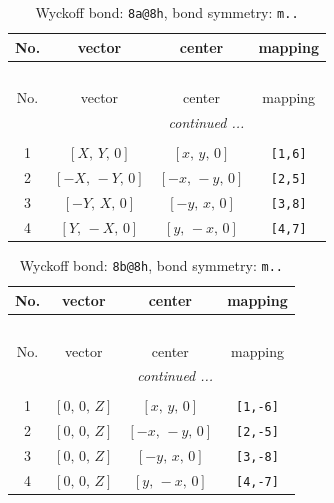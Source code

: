 \documentclass[fleqn,8pt]{jsarticle}
\begin{document}
\begin{longtable}{cccc}
\caption{Wyckoff bond: {\tt 8a@8h}, bond symmetry: {\tt m..}}
 \\
 \hline \hline
No. & vector & center & mapping \\ \hline \endfirsthead

\multicolumn{3}{l}{\tablename\ \thetable{}} \\
 \hline \hline
No. & vector & center & mapping \\ \hline \endhead

 \hline \hline
\multicolumn{3}{r}{\footnotesize\it continued ...} \\ \endfoot

 \hline \hline
\multicolumn{3}{r}{} \\ \endlastfoot

1 & $\left[ X,\, Y,\, 0 \right]$ & $\left[ x,\, y,\, 0 \right]$ & {\tt [1,6]} \\ \hline
2 & $\left[ - X,\, - Y,\, 0 \right]$ & $\left[ - x,\, - y,\, 0 \right]$ & {\tt [2,5]} \\ \hline
3 & $\left[ - Y,\, X,\, 0 \right]$ & $\left[ - y,\, x,\, 0 \right]$ & {\tt [3,8]} \\ \hline
4 & $\left[ Y,\, - X,\, 0 \right]$ & $\left[ y,\, - x,\, 0 \right]$ & {\tt [4,7]} \\
\end{longtable}
\renewcommand{\arraystretch}{1.2}
\begin{longtable}{cccc}
\caption{Wyckoff bond: {\tt 8b@8h}, bond symmetry: {\tt m..}}
 \\
 \hline \hline
No. & vector & center & mapping \\ \hline \endfirsthead

\multicolumn{3}{l}{\tablename\ \thetable{}} \\
 \hline \hline
No. & vector & center & mapping \\ \hline \endhead

 \hline \hline
\multicolumn{3}{r}{\footnotesize\it continued ...} \\ \endfoot

 \hline \hline
\multicolumn{3}{r}{} \\ \endlastfoot

1 & $\left[ 0,\, 0,\, Z \right]$ & $\left[ x,\, y,\, 0 \right]$ & {\tt [1,-6]} \\ \hline
2 & $\left[ 0,\, 0,\, Z \right]$ & $\left[ - x,\, - y,\, 0 \right]$ & {\tt [2,-5]} \\ \hline
3 & $\left[ 0,\, 0,\, Z \right]$ & $\left[ - y,\, x,\, 0 \right]$ & {\tt [3,-8]} \\ \hline
4 & $\left[ 0,\, 0,\, Z \right]$ & $\left[ y,\, - x,\, 0 \right]$ & {\tt [4,-7]} \\
\end{longtable}
\end{document}
